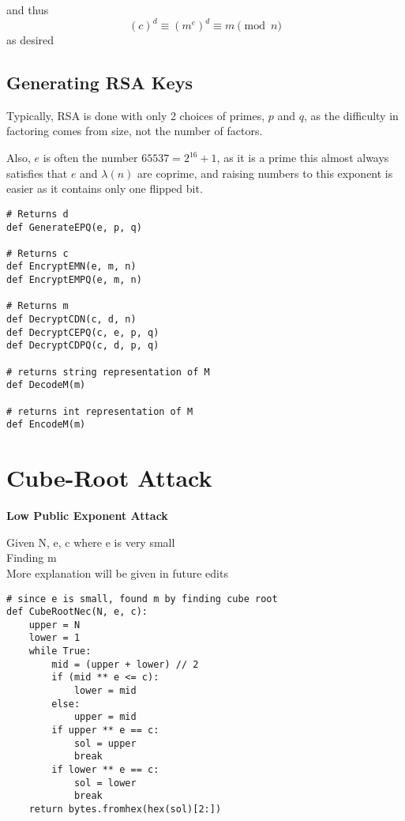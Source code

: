 \documentclass[11pt,notitlepage]{report}
\begin{document}
and thus
$$(c)^d \equiv (m^e)^d \equiv m \pmod{n}$$
as desired

\newpage
\subsection{Generating RSA Keys}

Typically, RSA is done with only 2 choices of primes, $p$ and $q$, as the difficulty in factoring comes from size, not the number of factors.

Also, $e$ is often the number $65537 = 2^{16} + 1$, as it is a prime this almost always satisfies that $e$ and $\lambda(n)$ are coprime, and raising numbers to this exponent is easier as it contains only one flipped bit.

\vspace{-2mm}
\begin{verbatim}
# Returns d
def GenerateEPQ(e, p, q)

# Returns c
def EncryptEMN(e, m, n)
def EncryptEMPQ(e, m, n)

# Returns m
def DecryptCDN(c, d, n)
def DecryptCEPQ(c, e, p, q)
def DecryptCDPQ(c, d, p, q)

# returns string representation of M
def DecodeM(m)

# returns int representation of M
def EncodeM(m)
\end{verbatim}


\newpage

\section{Cube-Root Attack}
\vspace{-5mm}
\textbf{Low Public Exponent Attack}

Given N, e, c where e is very small\\
Finding m\\

More explanation will be given in future edits

\begin{verbatim}
# since e is small, found m by finding cube root
def CubeRootNec(N, e, c):
    upper = N
    lower = 1
    while True:
        mid = (upper + lower) // 2
        if (mid ** e <= c):
            lower = mid
        else:
            upper = mid
        if upper ** e == c:
            sol = upper
            break
        if lower ** e == c:
            sol = lower
            break
    return bytes.fromhex(hex(sol)[2:])
\end{verbatim}
\end{document}
